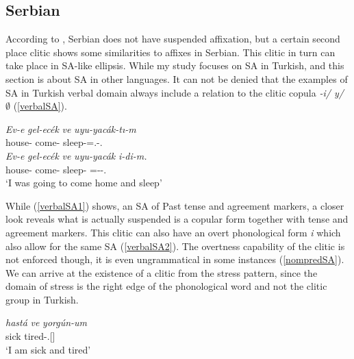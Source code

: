 \subsection{Serbian}

According to \cite{despic2017suspended}, Serbian does not have suspended affixation, but a certain second place clitic shows some similarities to affixes in Serbian. This clitic in turn can take place in SA-like ellipsis. While my study focuses on SA in Turkish, and this section is about SA in other languages. It can not be denied that the examples of SA in Turkish verbal domain always include a relation to the clitic copula \textit{-i/ y/ $\emptyset$} (\ref{verbalSA}).

\begin{exe}
    \ex \label{verbalSA}
    \begin{xlist}
        \ex \label{verbalSA1}
        \gll 
        \textit{Ev-e} \textit{gel-ec\'{e}k} \textit{ve} \textit{uyu-yac\'{a}k-tı-m} \\ house-{\Dat} come-{\Fut} {\And} sleep-{\Fut}={\Cop}.{\Pst}-{\First}.{\Sg} \\
        
        \ex \label{verbalSA2}
        \gll 
        \textit{Ev-e} \textit{gel-ec\'{e}k} \textit{ve} \textit{uyu-yac\'{a}k} \textit{i-di-m.} \\ house-{\Dat} come-{\Fut} {\And} sleep-{\Fut} ={\Cop}-{\Pst}-{\First}.{\Sg} \\
        \glt `I was going to come home and sleep'
    \end{xlist}
\end{exe}

While (\ref{verbalSA1}) shows, an SA of Past tense and agreement markers, a closer look reveals what is actually suspended is a copular form together with tense and agreement markers. This clitic can also have an overt phonological form \textit{i} which also allow for the same SA (\ref{verbalSA2}). The overtness capability of the clitic is not enforced though, it is even ungrammatical in some instances (\ref{nompredSA}). We can arrive at the existence of a clitic from the stress pattern, since the domain of stress is the right edge of the phonological word and not the clitic group in Turkish.

\begin{exe}
    \ex \label{nompredSA}
    \begin{xlist}
        \ex 
        \gll 
        \textit{hast\'{a}} \textit{ve} \textit{yorg\'{u}n-um} \\ sick {\And} tired-{\First}.{\Sg}[{\Prs}] \\
        \glt `I am sick and tired'
    \end{xlist}
\end{exe}

